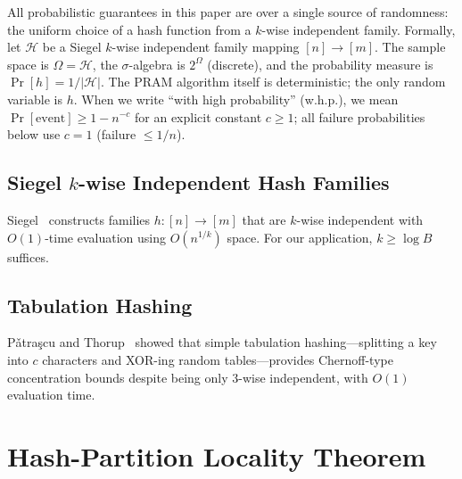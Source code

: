 \documentclass[11pt]{article}
\begin{document}
All probabilistic guarantees in this paper are over a single source of
randomness: the uniform choice of a hash function from a $k$-wise
independent family.  Formally, let $\mathcal{H}$ be a Siegel $k$-wise
independent family mapping $[n] \to [m]$.  The sample space is
$\Omega = \mathcal{H}$, the $\sigma$-algebra is $2^\Omega$ (discrete),
and the probability measure is $\Pr[h] = 1/|\mathcal{H}|$.  The PRAM
algorithm itself is deterministic; the only random variable is $h$.
When we write ``with high probability'' (w.h.p.), we mean
$\Pr[\text{event}] \ge 1 - n^{-c}$ for an explicit constant $c \ge 1$;
all failure probabilities below use $c = 1$ (failure $\le 1/n$).

\subsection{Siegel $k$-wise Independent Hash Families}

Siegel~\cite{siegel2004universal} constructs families $h: [n] \to [m]$
that are $k$-wise independent with $O(1)$-time evaluation using
$O(n^{1/k})$ space.  For our application, $k \ge \log B$ suffices.

\subsection{Tabulation Hashing}

P\v{a}tra\c{s}cu and Thorup~\cite{patrascu2012power} showed that simple
tabulation hashing---splitting a key into $c$ characters and XOR-ing
random tables---provides Chernoff-type concentration bounds despite being
only 3-wise independent, with $O(1)$ evaluation time.

\section{Hash-Partition Locality Theorem}
\label{sec:theory}
\end{document}
